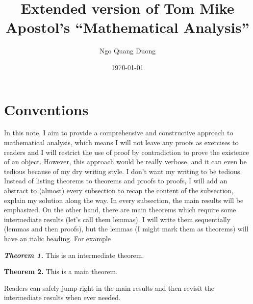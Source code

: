 \documentclass{mike-apostol-mathematical-analysis}
\title{Extended version of Tom Mike Apostol's ``Mathematical Analysis''}
\author{Ngo Quang Duong}
\date{\today}
\begin{document}
\maketitle

\tableofcontents

\chapter*{Conventions}

In this note, I aim to provide a comprehensive and constructive approach to mathematical analysis, which means I will not leave any proofs as exercises to readers and I will restrict the use of proof by contradiction to prove the existence of an object. However, this approach would be really verbose, and it can even be tedious because of my dry writing style. I don't want my writing to be tedious. Instead of listing theorems to theorems and proofs to proofs, I will add an abstract to (almost) every subsection to recap the content of the subsection, explain my solution along the way. In every subsection, the main results will be emphasized. On the other hand, there are main theorems which require some intermediate results (let's call them lemmas). I will write them sequentially (lemmas and then proofs), but the lemmas (I might mark them as theorems) will have an italic heading. For example

\noindent\textit{\textbf{Theorem 1.}} This is an intermediate theorem.

\noindent\textbf{Theorem 2.} This is a main theorem.

Readers can safely jump right in the main results and then revisit the intermediate results when ever needed.





\end{document}
